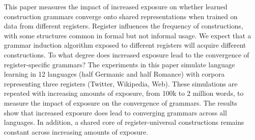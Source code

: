 This paper measures the impact of increased exposure on whether learned construction grammars converge onto shared representations when trained on data from different registers. Register influences the frequency of constructions, with some structures common in formal but not informal usage. We expect that a grammar induction algorithm exposed to different registers will acquire different constructions. To what degree does increased exposure lead to the convergence of register-specific grammars? The experiments in this paper simulate language learning in 12 languages (half Germanic and half Romance) with corpora representing three registers (Twitter, Wikipedia, Web). These simulations are repeated with increasing amounts of exposure, from 100k to 2 million words, to measure the impact of exposure on the convergence of grammars. The results show that increased exposure does lead to converging grammars across all languages. In addition, a shared core of register-universal constructions remains constant across increasing amounts of exposure.
